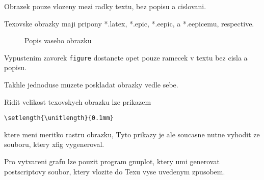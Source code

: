 Obrazek pouze vlozeny mezi radky textu, bez popisu a cislovani.\\
\epsfxsize=1cm
\rule{0pt}{0pt}\hfill{}\hfill\rule{0pt}{0pt}

Texovske obrazky maji pripony *.latex, *.epic, *.eepic, a *.eepicemu, respective. 
\begin{figure}[ht]
\begin{center}

\end{center}
\caption{Popis vaseho obrazku}
\label{l1}
\end{figure}
Vypustenim zavorek {\tt figure} dostanete opet pouze ramecek 
v textu bez cisla a popisu. 

Takhle jednoduse muzete poskladat obrazky vedle sebe.
\begin{center}
\setlength{\unitlength}{0.1mm}
\hglue 5mm 
\setlength{\unitlength}{0.15mm}
\hglue 5mm 
\setlength{\unitlength}{0.2mm}
\end{center}
Ridit velikost texovskych obrazku lze prikazem
\begin{verbatim}
\setlength{\unitlength}{0.1mm}
\end{verbatim}
ktere meni meritko rastru obrazku, Tyto prikazy je ale soucasne 
nutne vyhodit ze souboru, ktery xfig vygeneroval.

Pro vytvareni grafu lze pouzit program gnuplot, ktery umi generovat postscriptovy soubor, ktery vlozite
do Texu vyse uvedenym zpusobem.










